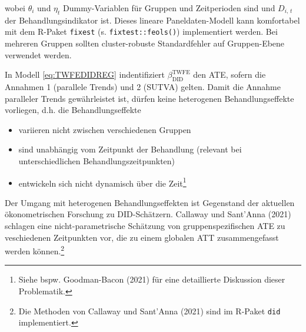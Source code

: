 \documentclass[
  a4paper,
  DIV=11,
  oneside]{scrreprt}
\providecommand{\tightlist}{%
  \setlength{\itemsep}{0pt}\setlength{\parskip}{0pt}}\usepackage{longtable,booktabs,array}
\begin{document}
wobei \(\theta_i\) und \(\eta_t\) Dummy-Variablen für Gruppen und
Zeitperioden sind und \(D_{i,\, t}\) der Behandlungsindikator ist.
Dieses lineare Paneldaten-Modell kann komfortabel mit dem R-Paket
\texttt{fixest} (s. \texttt{fixtest::feols()}) implementiert werden. Bei
mehreren Gruppen sollten cluster-robuste Standardfehler auf
Gruppen-Ebene verwendet werden.

In Modell \eqref{eq:TWFEDIDREG} indentifiziert
\(\beta_\text{DID}^\text{TWFE}\) den ATE, sofern die Annahmen 1
(parallele Trends) und 2 (SUTVA) gelten. Damit die Annahme paralleler
Trends gewährleistet ist, dürfen keine heterogenen Behandlungseffekte
vorliegen, d.h. die Behandlungseffekte

\begin{itemize}
\tightlist
\item
  variieren nicht zwischen verschiedenen Gruppen
\item
  sind unabhängig vom Zeitpunkt der Behandlung (relevant bei
  unterschiedlichen Behandlungszeitpunkten)
\item
  entwickeln sich nicht dynamisch über die Zeit\footnote{Siehe bspw.
    Goodman-Bacon (2021) für eine detaillierte Diskussion dieser
    Problematik.}
\end{itemize}

Der Umgang mit heterogenen Behandlungseffekten ist Gegenstand der
aktuellen ökonometrischen Forschung zu DID-Schätzern. Callaway und
Sant'Anna (2021) schlagen eine nicht-parametrische Schätzung von
gruppenspezifischen ATE zu veschiedenen Zeitpunkten vor, die zu einem
globalen ATT zusammengefasst werden können.\footnote{Die Methoden von
  Callaway und Sant'Anna (2021) sind im R-Paket \texttt{did}
  implementiert.}
\end{document}

